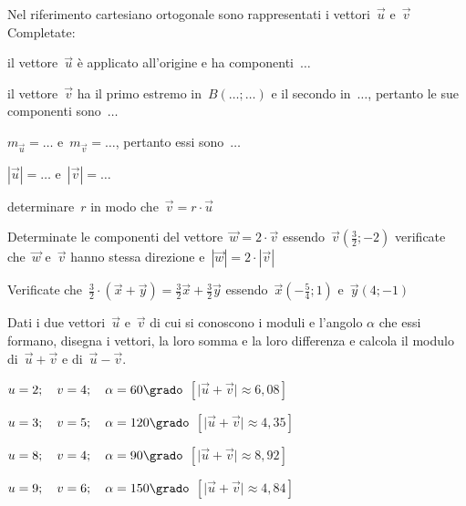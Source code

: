 \begin{multicols}{2}
\begin{esercizio}
\label{ese:vett.4}
Nel riferimento cartesiano ortogonale sono rappresentati i vettori~$\vec{u}$ 
e~$\vec{v}$ Completate:
\begin{enumeratea}
\item il vettore~$\vec{u}$ è applicato all'origine e ha componenti~$\ldots$
\item il vettore~$\vec{v}$ ha il primo estremo in~$B(\ldots;\ldots)$ e il 
secondo in~$\ldots$, pertanto le sue componenti sono~$\ldots$
\item $m_{\vec{u}}=\ldots$ e~$m_{\vec{v}}=\ldots$, pertanto essi sono~$\ldots$
\item $|\vec{u}|=\ldots$ e~$|\vec{v}|=\ldots$
\item determinare~$r$ in modo che~$\vec{v}=r \cdot \vec{u}$
\end{enumeratea}
\begin{center}
 
\end{center}
\end{esercizio}
\end{multicols}

\begin{esercizio}
\label{ese:vett.5}
Determinate le componenti del vettore~$\vec{w}=2 \cdot \vec{v}$ 
essendo~$\vec{v}(\frac {3}{2};-2)$ verificate che~$\vec{w}$ e~$\vec{v}$ hanno 
stessa direzione
e~$|\vec{w}|=2 \cdot |\vec{v}|$
\end{esercizio}

\begin{esercizio}
\label{ese:vett.6}
Verificate che~$\frac {3}{2} \cdot (\vec{x}+\vec{y})=\frac {3}{2}\vec{x}+\frac 
{3}{2}\vec{y}$ essendo~$\vec{x}(-\frac {5}{4};1)$ e~$\vec{y}(4;-1)$
\end{esercizio}

\begin{esercizio}
\label{ese:vett.7}
Dati i due vettori~$\vec{u}$ e~$\vec{v}$ di cui si conoscono i moduli e 
l'angolo $\alpha$ che essi formano, disegna i vettori, 
la loro somma e la loro differenza e 
calcola il modulo di~$\vec{u} + \vec{v}$ e di~$\vec{u} - \vec{v}$.
\begin{enumeratea}
\item $u=2; \quad v=4; \quad \alpha=60\grado$ 
 \hfill $\left[\lvert\vec{u} + \vec{v} \rvert \approx 6,08\right]$
\item $u=3; \quad v=5; \quad \alpha=120\grado$ 
 \hfill $\left[\lvert\vec{u} + \vec{v} \rvert \approx 4,35\right]$
\item $u=8; \quad v=4; \quad \alpha=90\grado$ 
 \hfill $\left[\lvert\vec{u} + \vec{v} \rvert \approx 8,92\right]$
\item $u=9; \quad v=6; \quad \alpha=150\grado$ 
 \hfill $\left[\lvert\vec{u} + \vec{v} \rvert \approx 4,84\right]$
\end{enumeratea}
\end{esercizio}

